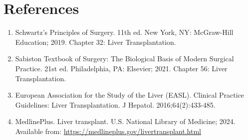 \section*{References}
\begin{enumerate}
  \item Schwartz's Principles of Surgery. 11th ed. New York, NY: McGraw-Hill Education; 2019. Chapter 32: Liver Transplantation.
  \item Sabiston Textbook of Surgery: The Biological Basis of Modern Surgical Practice. 21st ed. Philadelphia, PA: Elsevier; 2021. Chapter 56: Liver Transplantation.
  \item European Association for the Study of the Liver (EASL). Clinical Practice Guidelines: Liver Transplantation. J Hepatol. 2016;64(2):433-485.
  \item MedlinePlus. Liver transplant. U.S. National Library of Medicine; 2024. Available from: \url{https://medlineplus.gov/livertransplant.html}
\end{enumerate}

\clearpage

